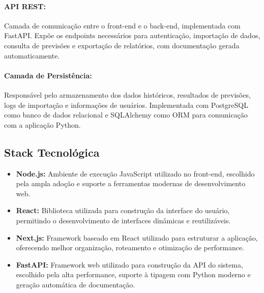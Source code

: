 \documentclass[12pt,a4paper]{article}
\begin{document}
\paragraph{API REST:}
Camada de comunicação entre o front-end e o back-end, implementada com
FastAPI. Expõe os endpoints necessários para autenticação, importação de
dados, consulta de previsões e exportação de relatórios, com documentação
gerada automaticamente.

\paragraph{Camada de Persistência:}
Responsável pelo armazenamento dos dados históricos, resultados de
previsões, logs de importação e informações de usuários. Implementada com
PostgreSQL como banco de dados relacional e SQLAlchemy como ORM para
comunicação com a aplicação Python.

\subsection{Stack Tecnológica}

\begin{itemize}
    \item \textbf{Node.js:} Ambiente de execução JavaScript utilizado no front-end, escolhido pela ampla adoção e suporte a ferramentas modernas de desenvolvimento web.
    \item \textbf{React:} Biblioteca utilizada para construção da interface do usuário, permitindo o desenvolvimento de interfaces dinâmicas e reutilizáveis.
    \item \textbf{Next.js:} Framework baseado em React utilizado para estruturar a aplicação, oferecendo melhor organização, roteamento e otimização de performance.
\end{itemize}

\begin{itemize}
    \item \textbf{FastAPI:} Framework web utilizado para construção da API do sistema, escolhido pela alta performance, suporte à tipagem com Python moderno e geração automática de documentação.
\end{itemize}
\end{document}
